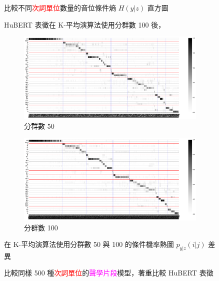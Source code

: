 {{\begin{figure}
            \caption{HuBERT 表徵在 K-平均演算法使用分群數 100 後，}
            比較不同\textcolor{red}{次詞單位}數量的音位條件熵 $H(y|z)$ 直方圖
            \label{fig:hub-u100-hist-comparisons}
        \end{figure}
    }

    {
        \begin{figure}
             \centering
             \begin{subfigure}{\textwidth}
                 \centering
                 \includegraphics[width=1\linewidth]{figures/ch4figs/hub-u050-ap0500-givenunit-byphn.png}
                 \caption{分群數 50}
                 \label{subfig:hub-u050-ap0500-givenunit-byphn--picked}
             \end{subfigure}
             \vfill
             \begin{subfigure}{\textwidth}
                 \centering
                 \includegraphics[width=1\linewidth]{figures/ch4figs/hub-u050-ap1000-givenunit-byphn.png}
                 \caption{分群數 100}
                 \label{subfig:hub-u100-ap0500-givenunit-byphn--picked}
             \end{subfigure}
             \caption{比較同樣 500 種\textcolor{red}{次詞單位}的\textcolor{magenta}{聲學片段}模型，著重比較 HuBERT 表徵}
             在 K-平均演算法使用分群數 50 與 100 的條件機率熱圖 $p_{y|z}(i|j)$ 差異
             \label{fig:check-ap0500}
        \end{figure}
    }

}
